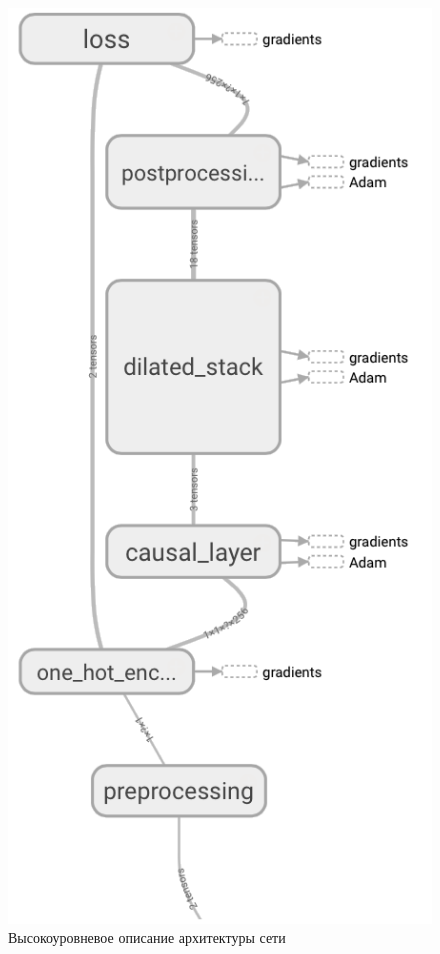 \documentclass[../diploma.tex]{subfiles}
\begin{document}
\begin{figure}[!htbp]
  \centering
  \includegraphics[scale=1.1]{img/network}
  \caption{Высокоуровневое описание архитектуры сети}
  \label{fig:arch_high}
\end{figure}


\end{document}
